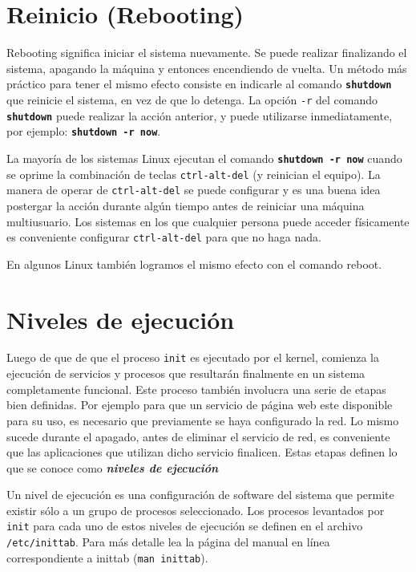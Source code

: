 \documentclass[12pt]{article}
\begin{document}
\section{ Reinicio (Rebooting)}

 Rebooting significa iniciar el sistema nuevamente. Se puede realizar
finalizando el sistema, apagando la máquina y entonces encendiendo de vuelta. Un
método más práctico para tener el mismo efecto consiste en indicarle al comando
\texttt{\textbf{shutdown}} que reinicie el sistema, en vez de que lo detenga.
La opción \texttt{-r} del comando \texttt{\textbf{shutdown}} puede
realizar la acción anterior, y puede utilizarse inmediatamente, por ejemplo:
\texttt{\textbf{shutdown -r now}}.  

 La mayoría de los sistemas Linux ejecutan el comando \texttt{\textbf{shutdown -r
now}} cuando se oprime la combinación de teclas \texttt{ctrl-alt-del} (y
reinician el equipo). La manera de operar de \texttt{ctrl-alt-del} se puede configurar y
es una buena idea postergar la acción durante algún tiempo antes de reiniciar
una máquina multiusuario. Los sistemas en los que cualquier persona puede
acceder físicamente es conveniente configurar \texttt{ctrl-alt-del} para que no haga
nada.

En algunos Linux también logramos el mismo efecto con el comando reboot.

\section {Niveles de ejecución}

Luego de que de que el proceso \texttt{init} es ejecutado por el kernel, comienza 
la ejecución de servicios y procesos que resultarán finalmente en un sistema 
completamente funcional. Este proceso también involucra una serie de etapas bien 
definidas. Por ejemplo para que un servicio de página web 
este disponible para su uso, es necesario que previamente 
se haya configurado la red. Lo mismo sucede durante el apagado, antes de 
eliminar el servicio de red, es conveniente que las aplicaciones que 
utilizan dicho servicio finalicen. Estas etapas definen lo que se conoce como 
\textit{\textbf{niveles de ejecución}}

Un nivel de ejecución es una configuración de software del sistema que permite 
existir sólo a un grupo de procesos seleccionado. Los procesos levantados por 
\texttt{init} para cada uno de estos niveles de ejecución se definen en el archivo 
\texttt{/etc/inittab}. Para más detalle lea la página del manual en línea 
correspondiente a inittab (\texttt{man inittab}).
 
\end{document}
